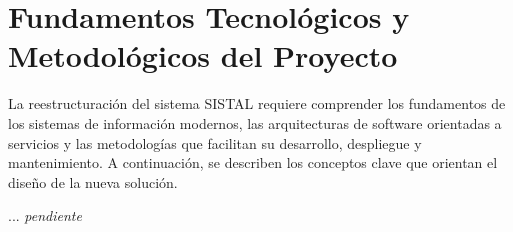 \section{Fundamentos Tecnológicos y Metodológicos del Proyecto}

La reestructuración del sistema SISTAL requiere comprender los fundamentos de los sistemas de información modernos, las arquitecturas de software orientadas a servicios y las metodologías que facilitan su desarrollo, despliegue y mantenimiento. A continuación, se describen los conceptos clave que orientan el diseño de la nueva solución.

... \textit{pendiente}

\begin{comment}
    \subsection{Sistemas de Información y su Rol en la Gestión Organizacional}

    Un \textit{sistema de información} es un conjunto integrado de componentes que permite capturar, procesar, almacenar y distribuir información para apoyar la toma de decisiones y el control dentro de una organización. Estos sistemas combinan personas, procesos, datos y tecnología, buscando mejorar la eficiencia operativa y la calidad del servicio.

    En el caso de la gestión de uniformes, un sistema de información como SISTAL facilita la trazabilidad de pedidos, la personalización de tallas y la coordinación entre los distintos actores involucrados (funcionarios, administradores y proveedores). Su adecuada arquitectura es esencial para garantizar la continuidad y confiabilidad de los procesos institucionales.

    \subsection{Arquitectura de Software}

    La \textit{arquitectura de software} define la estructura organizativa de un sistema y las relaciones entre sus componentes. Un diseño arquitectónico adecuado permite alcanzar cualidades como mantenibilidad, escalabilidad y flexibilidad ante cambios futuros.

    Tradicionalmente, muchos sistemas como SISTAL se desarrollaron bajo un \textit{modelo monolítico}, en el cual todas las funcionalidades están estrechamente integradas en una única aplicación. Si bien este enfoque simplifica el despliegue inicial, con el tiempo dificulta la incorporación de nuevas características, la escalabilidad independiente de módulos y la adopción de tecnologías modernas.


\end{comment}
